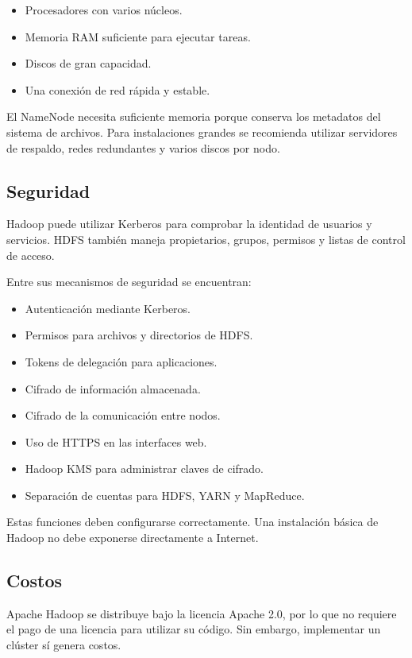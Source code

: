 \begin{itemize}
    \item Procesadores con varios núcleos.
    \item Memoria RAM suficiente para ejecutar tareas.
    \item Discos de gran capacidad.
    \item Una conexión de red rápida y estable.
\end{itemize}

El NameNode necesita suficiente memoria porque conserva los metadatos del
sistema de archivos. Para instalaciones grandes se recomienda utilizar
servidores de respaldo, redes redundantes y varios discos por nodo.

\subsection{Seguridad}

Hadoop puede utilizar Kerberos para comprobar la identidad de usuarios y
servicios. HDFS también maneja propietarios, grupos, permisos y listas de
control de acceso.

Entre sus mecanismos de seguridad se encuentran:

\begin{itemize}
    \item Autenticación mediante Kerberos.
    \item Permisos para archivos y directorios de HDFS.
    \item Tokens de delegación para aplicaciones.
    \item Cifrado de información almacenada.
    \item Cifrado de la comunicación entre nodos.
    \item Uso de HTTPS en las interfaces web.
    \item Hadoop KMS para administrar claves de cifrado.
    \item Separación de cuentas para HDFS, YARN y MapReduce.
\end{itemize}

Estas funciones deben configurarse correctamente. Una instalación básica de
Hadoop no debe exponerse directamente a Internet.

\subsection{Costos}

Apache Hadoop se distribuye bajo la licencia Apache 2.0, por lo que no requiere
el pago de una licencia para utilizar su código. Sin embargo, implementar un
clúster sí genera costos.

